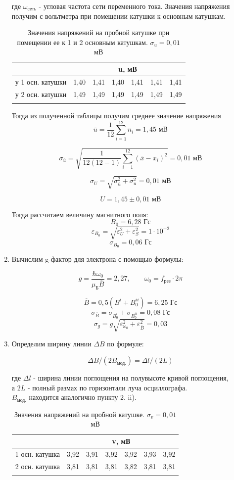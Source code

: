 \documentclass[a4paper, 12pt]{article}%
\begin{document}
\begin{enumerate}
		где $\omega_{\text{сеть}}$ - угловая частота сети переменного тока.
		Значения напряжения получим с вольтметра при помещении катушки к основным катушкам.
		\begin{longtable}{|c|c|c|c|c|c|c|}
			\hline
			& \multicolumn{6}{c|}{u, мВ} \\ \hline
			у 1 осн. катушки & 1,40 & 1,41 & 1,40 & 1,41 & 1,41 & 1,41 \\ \hline
			у 2 осн. катушки & 1,49 & 1,49 & 1,49 & 1,49 & 1,49 & 1,49 \\ \hline
			\caption{Значения напряжений на пробной катушке при помещении ее к 1 и 2 основным катушкам. $\sigma_u = 0,01$ мВ}
		\end{longtable}
		Тогда из полученной таблицы получим среднее значение напряжения
		$$\overline{u} = \frac{1}{12} \sum_{i = 1}^{12} n_i = 1,45 \text{ мВ}$$
		
		$$ \sigma_{\overline{u}} = \sqrt{\frac{1}{12(12-1)} \sum_{i = 1}^{12} (\overline{x} - x_i)^2} = 0,01 \text{ мВ}$$
		
		$$ \sigma_{U} = \sqrt{\sigma_{\overline{u}}^2 + \sigma_{u}^2 } = 0,01 \text{ мВ}$$
		
		$$ U = 1,45 \pm 0,01 \text{ мВ} $$
		
		Тогда рассчитаем величину магнитного поля:
		$$ B_0 = 6,28 \text{ Гс}$$
		$$ \varepsilon_{B_0} = \sqrt{\varepsilon_U^2 + \varepsilon_S^2} = 1 \cdot 10^{-2} $$
		$$ \sigma_{B_0} = 0,06 \text{ Гс}$$
		
		
		\item Вычислим g-фактор для электрона с помощью формулы:
		
		$$ g = \frac{\hbar \omega_0}{\mu_{\text{Б}} \overline{B}} = 2,27, \qquad \omega_0 = f_{\text{рез}} \cdot 2\pi$$
		
		$$\overline{B} = 0,5 (B^i + B_0^{ii}) = 6,25 \text{ Гс}$$
		$$ \sigma_{\overline {B}} = \sigma_{B_0^i}+ \sigma_{B_0^{ii}} = 0,08 \text{ Гс}$$
		$$ \sigma_g = g\sqrt{\varepsilon_{\omega_0}^2 + \varepsilon_{\overline{B}}^2} = 0,03$$
		\item Определим ширину линии $\Delta B$ по формуле:
		
		$$ \Delta B /(2 B_{\text{мод.}}) = \Delta l / (2L) $$
		
		где $\Delta l$ - ширина линии поглощения на полувысоте кривой поглощения, \\
		а 2$L$ - полный размах по горизонтали луча осциллографа. \\
		
		
		$ B_{\text{мод.}} $ находится аналогично пункту 2. ii).
		\begin{longtable}{|c|c|c|c|c|c|c|}
			\hline
			& \multicolumn{6}{c|}{v, мВ} \\ \hline
			1 осн. катушка & 3,92 & 3,91 & 3,92 & 3,92 & 3,93 & 3,92 \\ \hline
			2 осн. катушка & 3,81 & 3,81 & 3,81 & 3,82 & 3,81 & 3,81 \\ \hline
			\caption{Значения напряжений на пробной катушке. $\sigma_v = 0,01$ мВ}
		\end{longtable}
		

\end{enumerate}
\end{document}
